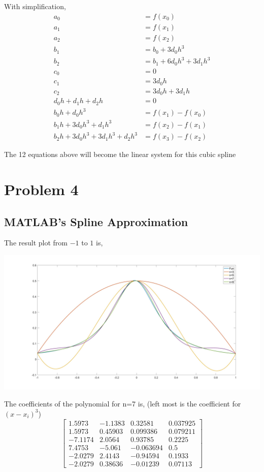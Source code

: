 \documentclass{article}
\newcommand{\bmat}[1]{\begin{bmatrix} #1 \end{bmatrix}}
\begin{document}
With simplification,
\setcounter{equation}{0}
\begin{align}
    a_0 &= f(x_0)\nonumber\\
    a_1 &= f(x_1)\nonumber\\
    a_2 &= f(x_2)\nonumber\\
    b_1 &= b_0 + 3d_0h^3 \\
    b_2 &= b_1 + 6d_0h^3 + 3d_1h^3\\
    c_0 &= 0\nonumber\\
    c_1 &= 3d_0h \nonumber\\
    c_2 &= 3d_0h + 3d_1h \nonumber\\
    d_0h + d_1h + d_2h &= 0 \\
    b_0h + d_0h^3 &= f(x_1) - f(x_0)\\
    b_1h + 3d_0h^3 + d_1h^3 &= f(x_2) - f(x_1)\\
    b_2h + 3d_0h^3 + 3d_1h^3 + d_2h^3 &= f(x_3) - f(x_2)
\end{align}

The 12 equations above will become the linear system for this cubic spline





\section*{Problem 4}
\subsection*{MATLAB's Spline Approximation}
The result plot from $-1$ to $1$ is,
\begin{center}
    \includegraphics[scale = 0.2]{ps3_q41.jpg}
\end{center}
The coefficients of the polynomial for n=7 is, (left most is the coefficient for $(x-x_i)^3$)
$$\bmat{1.5973   &   -1.1383    &  0.32581  &   0.037925\\
1.5973     & 0.45903  &   0.099386 &    0.079211\\
-7.1174    &   2.0564  &    0.93785      & 0.2225\\
7.4753     &  -5.061   & -0.063694       &   0.5\\
-2.0279    &   2.4143   &  -0.94594     &  0.1933\\
-2.0279    &  0.38636   &  -0.01239    &  0.07113}$$
\end{document}
